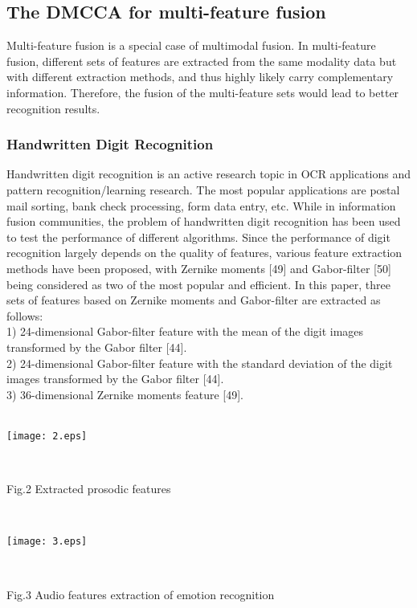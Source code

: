 \documentclass[journal]{IEEEtran}
\begin{document}
\subsection{The DMCCA for multi-feature fusion}
Multi-feature fusion is a special case of multimodal fusion. In multi-feature fusion, different sets of features are extracted from the same modality data but with different extraction methods, and thus highly likely carry complementary information. Therefore, the fusion of the multi-feature sets would lead to better recognition results.
\subsubsection{Handwritten Digit Recognition}
Handwritten digit recognition is an active research topic in OCR applications and pattern recognition/learning research. The most popular applications are postal mail sorting, bank check processing, form data entry, etc. While in information fusion communities, the problem of handwritten digit recognition has been used to test the performance of different algorithms. Since the performance of digit recognition largely depends on the quality of features, various feature extraction methods have been proposed, with Zernike moments [49] and Gabor-filter [50] being considered as two of the most popular and efficient. In this paper, three sets of features based on Zernike moments and Gabor-filter are extracted as follows:\\
1) 24-dimensional Gabor-filter feature with the mean of the digit images transformed by the Gabor filter [44].\\
2) 24-dimensional Gabor-filter feature with the standard deviation of the digit images transformed by the Gabor filter [44].\\
3) 36-dimensional Zernike moments feature [49].\\\
\centerline {\texttt{[image: 2.eps]}}\\ \centerline {Fig.2 Extracted prosodic features}\\\indent
\centerline {\texttt{[image: 3.eps]}}\\ \centerline {Fig.3 Audio features extraction of emotion recognition}\\\indent
\end{document}
